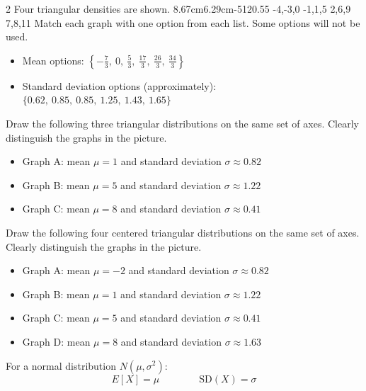 \begin{multicols}{2}
		\vspace{-0.35cm}
		Four triangular densities are shown.
		\vspace{-0.7cm}
		\TriangularFourGraph
		{8.67cm}{6.29cm}{-5}{12}{0.55}
		{-4,-3,0}
		{-1,1,5}
		{2,6,9}
		{7,8,11}
		Match each graph with one option from each list. Some options will not be used.
		\begin{itemize}
			\item Mean options: $\left\{-\frac{7}{3},\ 0,\ \frac{5}{3},\ \frac{17}{3},\ \frac{26}{3},\ \frac{34}{3} \right\}$
			\item Standard deviation options (approximately): $\{0.62,\ 0.85,\ 0.85,\ 1.25,\ 1.43,\ 1.65\}$
		\end{itemize}
		
		\vspace{-0.35cm}
		Draw the following three triangular distributions on the same set of axes. Clearly distinguish the graphs in the picture.
		\begin{itemize}
			\item Graph A: mean $\mu=1$ and standard deviation $\sigma\approx0.82$
			\item Graph B: mean $\mu=5$ and standard deviation $\sigma\approx1.22$
			\item Graph C: mean $\mu=8$ and standard deviation $\sigma\approx0.41$
		\end{itemize}
		
		
		\vspace{-0.35cm}
		Draw the following four centered triangular distributions on the same set of axes. Clearly distinguish the graphs in the picture.
		\begin{itemize}
			\item Graph A: mean $\mu=-2$ and standard deviation $\sigma\approx0.82$
			\item Graph B: mean $\mu=1$ and standard deviation $\sigma\approx1.22$
			\item Graph C: mean $\mu=5$ and standard deviation $\sigma\approx0.41$
			\item Graph D: mean $\mu=8$ and standard deviation $\sigma\approx1.63$
		\end{itemize}
		
		\vspace{-0.35cm}
		For a normal distribution $N(\mu,\sigma^2)$:
		\[
		E[X]=\mu
		\qquad \qquad
		\mathrm{SD}(X)=\sigma
		\]
		

\end{multicols}
